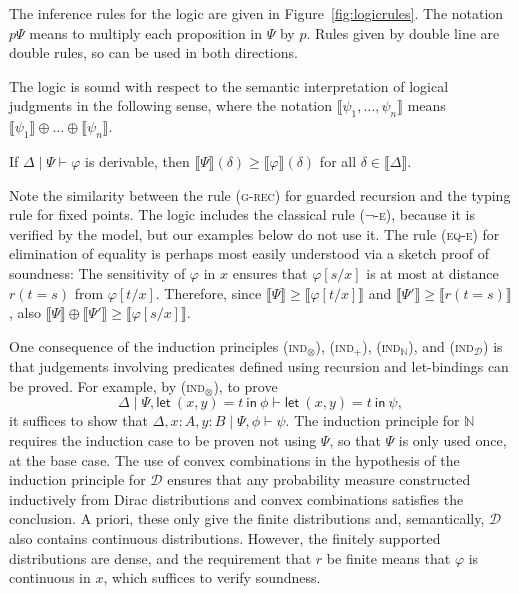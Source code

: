 \documentclass[a4paper,UKenglish,cleveref, autoref, thm-restate]{lipics-v2021}
\newcommand{\mprod}{\otimes}
\newcommand{\nat}{\mathbb{N}}
\newcommand{\letIn}[2]{\mathsf{let~} #1 \mathsf{~in~} #2}
\newcommand{\TD}{\mathcal{D}}
\newcommand{\logicJ}[3][\Delta]{#1 \mid #2 \vdash #3}
\newcommand{\peq}{=}
\newcommand{\den}[1]{\llbracket #1\rrbracket}
\begin{document}
The inference rules for the logic are given in Figure~\ref{fig:logicrules}. The notation $p\Psi$ means to multiply each proposition in $\Psi$ by $p$. Rules given by double line are double rules, so can be used in both directions.

The logic is sound with respect to the semantic interpretation of logical judgments in the following sense, where the notation $\den{\psi_1, \dots, \psi_n}$ means $\den{\psi_1} \oplus \dots \oplus \den{\psi_n}$.
\begin{theorem}[Soundness] \label{thm:Soundness:Logic}
If $\logicJ[\Delta]{\Psi}{\varphi}$ is derivable,
then $\den{\Psi}(\delta) \geq \den{\varphi}(\delta)$ for all $\delta\in\den\Delta$.
\end{theorem}

Note the similarity between the rule (\textsc{g-rec}) for guarded recursion  and the typing rule for fixed points. 
The logic includes the classical rule (\textsc{$\neg$-e}), because it is verified by the model, but our examples below do not use it. 
The rule (\textsc{eq-e}) for elimination of equality is perhaps most easily understood via a sketch proof of soundness: The sensitivity
of $\varphi$ in $x$ ensures that $\varphi[s/x]$ is at most at distance $r(t \peq s)$ from $\varphi[t/x]$. Therefore, since 
$\den{\Psi} \geq \den{\varphi[t/x]}$ and $\den{\Psi'} \geq \den{r(t \peq s)}$, also 
$\den{\Psi} \oplus \den{\Psi'} \geq \den{\varphi[s/x]}$. 

One consequence of the induction principles (\textsc{ind}${}_\mprod$), (\textsc{ind}${}_+$), (\textsc{ind}${}_\nat$), and (\textsc{ind}${}_\TD$) is that judgements involving 
predicates defined using recursion and let-bindings can be proved. For example, by (\textsc{ind}${}_\mprod$), to prove 
\[\logicJ[\Delta]{\Psi, \letIn{(x,y) = t}{\phi}}{\letIn{(x,y) = t}{\psi}},\] it suffices to show that 
$\logicJ[\Delta, x: A, y: B]{\Psi,\phi}{\psi}$. The induction principle for $\nat$ requires the induction
case to be proven not using $\Psi$, so that $\Psi$ is only used once, at the base case. 
The use of convex combinations in the hypothesis of the induction principle for $\TD$ ensures that any probability measure constructed inductively from Dirac distributions and convex combinations satisfies the conclusion. A priori, these only give the finite distributions
and, semantically, $\TD$ also contains continuous distributions. However, the finitely supported distributions are dense, and the requirement that $r$ be finite means that $\varphi$ is continuous in $x$, which suffices to verify soundness.
\end{document}
